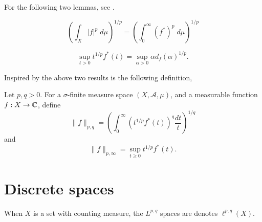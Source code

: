 For the following two lemmas, see \cite{Grafakos1}.
\begin{lemma}
    \begin{equation*}
        \left(\int_X |f|^p\;d\mu\right)^{1/p} = \left(\int_0^\infty (f^*)^p\;d\mu\right)^{1/p}
    \end{equation*}
\end{lemma}
\begin{lemma}
    \begin{equation*}
        \sup_{t>0} t^{1/p}f^*(t) = \sup_{\alpha > 0} \alpha d_f(\alpha)^{1/p}.
    \end{equation*}
\end{lemma}

Inspired by the above two results is the following definition,
\begin{definition}
    Let $p,q > 0$. For a $\sigma$-finite measure space $(X,\mathcal{A},\mu)$, 
    and a measurable function $f:X\rightarrow \mathbb{C}$, define
    \begin{equation*}
        \|f\|_{p,q} = \left(\int_0^\infty (t^{1/p}f^*(t))^q\frac{dt}{t}\right)^{1/q}
    \end{equation*}
    and
    \begin{equation*}
        \|f\|_{p,\infty} = \sup_{t\geq 0} t^{1/p} f^*(t).
    \end{equation*}
\end{definition}

\section{Discrete spaces}
When $X$ is a set with counting measure, the $L^{p,q}$ spaces
are denotes $\ell^{p,q}(X)$. 

